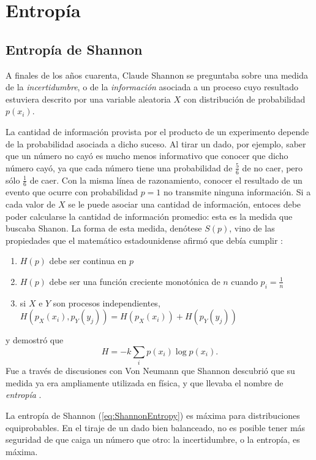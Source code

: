 \section{Entropía}
\subsection{Entropía de Shannon}
A finales de los años cuarenta, Claude Shannon se preguntaba sobre una medida de la \textit{incertidumbre}, o de la \textit{información} asociada a un proceso cuyo resultado estuviera descrito por una variable aleatoria $X$ con distribución de probabilidad $p(x_{i})$.

La cantidad de información provista por el producto de un experimento depende de la probabilidad asociada a dicho suceso. Al tirar un dado, por ejemplo, saber que un número no cayó es mucho menos informativo que conocer que dicho número cayó, ya que cada número tiene una probabilidad de $\frac{5}{6}$ de no caer, pero sólo $\frac{1}{6}$ de caer. Con la misma línea de razonamiento, conocer el resultado de un evento que ocurre con probabilidad $p=1$ no transmite ninguna información. Si a cada valor de $X$ se le puede asociar una cantidad de información, entoces debe poder calcularse la cantidad de información promedio: esta es la medida que buscaba Shanon. La forma de esta medida, denótese $S(p)$, vino de las propiedades que el matemático estadounidense afirmó que debía cumplir :
\begin{enumerate}
    \item $H(p)$ debe ser continua en $p$
    \item $H(p)$ debe ser una función creciente monotónica de $n$ cuando $p_{i}=\frac{1}{n}$
    \item si $X$ e $Y$ son procesos independientes, $H(p_{X}(x_{i}),p_{Y}(y_{j}))=H(p_{X}(x_{i}))+H(p_{Y}(y_{j}))$
\end{enumerate}
y demostró que
\begin{equation}\label{eq:ShannonEntropy}
    H=-k\sum_{i}p(x_{i})\log{p(x_{i})}.
\end{equation}
Fue a través de discusiones con Von Neumann que Shannon descubrió que su medida ya era ampliamente utilizada en física, y que llevaba el nombre de \textit{entropía} \cite{McIrvine}.

La entropía de Shannon (\ref{eq:ShannonEntropy}) es máxima para distribuciones equiprobables. En el tiraje de un dado bien balanceado, no es posible tener más seguridad de que caiga un número que otro: la incertidumbre, o la entropía, es máxima.

